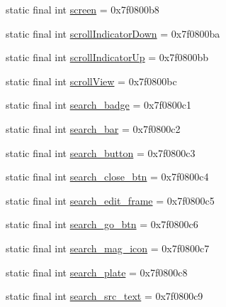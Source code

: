 \begin{DoxyCompactItemize}
\item 
static final int \mbox{\hyperlink{classandroid_1_1support_1_1v7_1_1appcompat_1_1_r_1_1id_a999bf5411538fa6caab27efaeddea15e}{screen}} = 0x7f0800b8
\item 
static final int \mbox{\hyperlink{classandroid_1_1support_1_1v7_1_1appcompat_1_1_r_1_1id_a7e3bdeb1ba7e1d2a81995fb3225f0b86}{scroll\+Indicator\+Down}} = 0x7f0800ba
\item 
static final int \mbox{\hyperlink{classandroid_1_1support_1_1v7_1_1appcompat_1_1_r_1_1id_a331a78b0369cf9e185e49132315336cd}{scroll\+Indicator\+Up}} = 0x7f0800bb
\item 
static final int \mbox{\hyperlink{classandroid_1_1support_1_1v7_1_1appcompat_1_1_r_1_1id_a2c75911e3d2885b50876721cd34f2cc6}{scroll\+View}} = 0x7f0800bc
\item 
static final int \mbox{\hyperlink{classandroid_1_1support_1_1v7_1_1appcompat_1_1_r_1_1id_a2ee860df597b218b135c65ac1241c346}{search\+\_\+badge}} = 0x7f0800c1
\item 
static final int \mbox{\hyperlink{classandroid_1_1support_1_1v7_1_1appcompat_1_1_r_1_1id_a37282400460588b9933a8f3b8c74d577}{search\+\_\+bar}} = 0x7f0800c2
\item 
static final int \mbox{\hyperlink{classandroid_1_1support_1_1v7_1_1appcompat_1_1_r_1_1id_a9a458b08585f3fe2c509d27967fbfa5a}{search\+\_\+button}} = 0x7f0800c3
\item 
static final int \mbox{\hyperlink{classandroid_1_1support_1_1v7_1_1appcompat_1_1_r_1_1id_a6af82c5fe032136546b41b96b191c185}{search\+\_\+close\+\_\+btn}} = 0x7f0800c4
\item 
static final int \mbox{\hyperlink{classandroid_1_1support_1_1v7_1_1appcompat_1_1_r_1_1id_a8b2c997939e7855cb1513ebc8deb69c5}{search\+\_\+edit\+\_\+frame}} = 0x7f0800c5
\item 
static final int \mbox{\hyperlink{classandroid_1_1support_1_1v7_1_1appcompat_1_1_r_1_1id_a55313edde7c5ac6053e414c67e43c4db}{search\+\_\+go\+\_\+btn}} = 0x7f0800c6
\item 
static final int \mbox{\hyperlink{classandroid_1_1support_1_1v7_1_1appcompat_1_1_r_1_1id_aad15bb656dd8d095094b7085bf2fecee}{search\+\_\+mag\+\_\+icon}} = 0x7f0800c7
\item 
static final int \mbox{\hyperlink{classandroid_1_1support_1_1v7_1_1appcompat_1_1_r_1_1id_ae9cb3debcecb3c277a635dc221a0025e}{search\+\_\+plate}} = 0x7f0800c8
\item 
static final int \mbox{\hyperlink{classandroid_1_1support_1_1v7_1_1appcompat_1_1_r_1_1id_a2766f5877537681409847f9e8460ffeb}{search\+\_\+src\+\_\+text}} = 0x7f0800c9

\end{DoxyCompactItemize}
